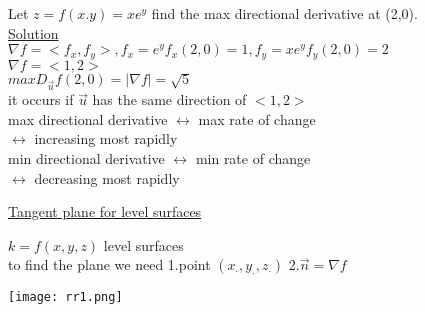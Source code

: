 \begin{example}
Let $z = f(x.y) = xe^{y}$ find the max directional derivative at (2,0).\\
\underline{\textbf{\large}\color{smalt(darkpowderblue)}Solution}\\
$\nabla f = <f_x ,f_y> , f_x = e^{y} f_x(2,0) = 1 , f_y = xe^{y} f_y (2,0) = 2$\\
$\nabla f = <1,2>$\\
$max D_{\overrightarrow{u}} f(2,0) = |\nabla f| = \surd 5$\\
it occurs if ${\overrightarrow{u}}$ has the same direction of $<1,2>$\\
max directional derivative $\leftrightarrow$ max rate of change \\
                           $\leftrightarrow$ increasing most rapidly \\
min directional derivative $\leftrightarrow$ min rate of change\\
                           $\leftrightarrow$ decreasing most rapidly

\end{example} 
\noindent{\color{smalt(darkpowderblue)}\rule{\linewidth}{.2mm}}
\underline{\textbf{\large}\color{smalt(darkpowderblue)}Tangent plane for level surfaces}\\
\noindent\begin{minipage}{0.5\textwidth}
$k = f(x,y,z)$ level surfaces\\
to find the plane we need 
    1.point $(x_\cdot , y_\cdot , z_\cdot)$
    2.${\overrightarrow{n}} = \nabla f$\\
\end{minipage}
\noindent\begin{minipage}{0.5\textwidth}
\begin{center}
   \texttt{[image: rr1.png]}\\
\end{center}\end{minipage}
\noindent{\color{smalt(darkpowderblue)}\rule{\linewidth}{.2mm}}

